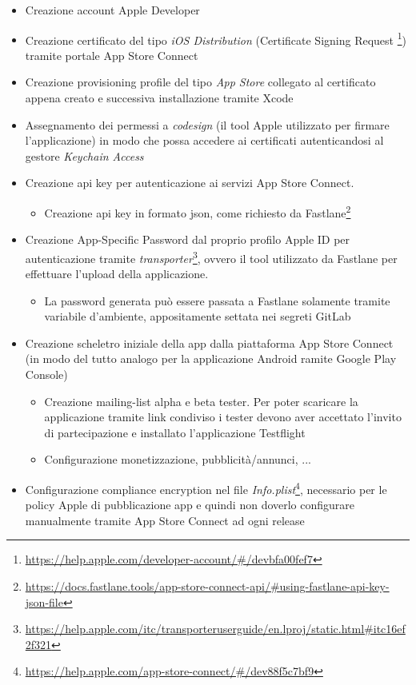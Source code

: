 \begin{itemize}
    \item Creazione account Apple Developer
    \item Creazione certificato del tipo \textit{iOS Distribution} (Certificate Signing Request \footnote{\url{https://help.apple.com/developer-account/\#/devbfa00fef7}}) tramite portale App Store Connect
    \item Creazione provisioning profile del tipo \textit{App Store} collegato al certificato appena creato e successiva installazione tramite Xcode
    \item Assegnamento dei permessi a \textit{codesign} (il tool Apple utilizzato per firmare l'applicazione) in modo che possa accedere ai certificati autenticandosi al gestore \textit{Keychain Access}
    \item Creazione api key per autenticazione ai servizi App Store Connect. 
    \begin{itemize}
        \item Creazione api key in formato json, come richiesto da Fastlane\footnote{\url{https://docs.fastlane.tools/app-store-connect-api/\#using-fastlane-api-key-json-file}}
    \end{itemize}
    \item Creazione App-Specific Password dal proprio profilo Apple ID per autenticazione tramite \textit{transporter}\footnote{\url{https://help.apple.com/itc/transporteruserguide/en.lproj/static.html\#itc16ef2f321}}, ovvero il tool utilizzato da Fastlane per effettuare l'upload della applicazione. 
    \begin{itemize}
        \item La password generata può essere passata a Fastlane solamente tramite variabile d'ambiente, appositamente settata nei segreti GitLab
    \end{itemize}
    \item Creazione scheletro iniziale della app dalla piattaforma App Store Connect (in modo del tutto analogo per la applicazione Android ramite Google Play Console)
    \begin{itemize}
        \item Creazione mailing-list alpha e beta tester. Per poter scaricare la applicazione tramite link condiviso i tester devono aver accettato l'invito di partecipazione e installato l'applicazione Testflight
        \item Configurazione monetizzazione, pubblicità/annunci, ...
    \end{itemize}
    \item Configurazione compliance encryption nel file \textit{Info.plist}\footnote{\url{https://help.apple.com/app-store-connect/\#/dev88f5c7bf9}}, necessario per le policy Apple di pubblicazione app e quindi non doverlo configurare manualmente tramite App Store Connect ad ogni release
\end{itemize}

